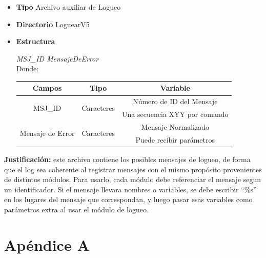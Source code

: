 \documentclass[a4paper,10pt,titlepage]{article}
\begin{document}
			\begin {itemize}
				\item \textbf{Tipo} {Archivo auxiliar de Logueo}
				\item \textbf{Directorio} {LoguearV5}
				\item \textbf{Estructura} {\textit{MSJ\_ID MensajeDeError}\\
					Donde: \ 
					\begin{table}[H]
					\centering
					\begin{tabular}{| c | c | c |}
						\hline
						Campos 	& Tipo & Variable\\
						\hline
						\multirow{2}{*}{MSJ\_ID } & \multirow{2}{*}{Caracteres} & Número de ID del Mensaje\\
						{} & {} & Una secuencia XYY por comando \\
						\hline 
						\multirow{2}{*}{Mensaje de Error} & \multirow{2}{*}{Caracteres} & Mensaje Normalizado \\ 
						{} & {} &  Puede recibir parámetros \\
						\hline
					\end{tabular}
					\end{table}
				}
			\end{itemize}

\textbf{Justificación:}  este archivo contiene los posibles mensajes de logueo, de forma que el log sea coherente al registrar mensajes con el mismo propósito provenientes de distintos módulos. Para usarlo, cada módulo debe referenciar el mensaje segun un identificador. Si el mensaje llevara nombres o variables, se debe escribir ``\%s'' en los lugares del mensaje que correspondan, y luego pasar esas variables como parámetros extra al usar el módulo de logueo.



\newpage

\section{Ap\'endice A}
\end{document}
